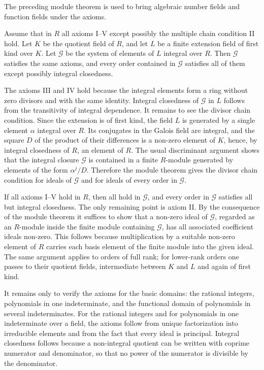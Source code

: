\documentclass[11pt]{article}
\begin{document}
The preceding module theorem is used to bring algebraic number fields and function fields under the axioms.

Assume that in $R$ all axioms I--V except possibly the multiple chain condition II hold. Let $K$ be the quotient field of $R$, and let $L$ be a finite extension field of first kind over $K$. Let $\mathcal G$ be the system of elements of $L$ integral over $R$. Then $\mathcal G$ satisfies the same axioms, and every order contained in $\mathcal G$ satisfies all of them except possibly integral closedness.

The axioms III and IV hold because the integral elements form a ring without zero divisors and with the same identity. Integral closedness of $\mathcal G$ in $L$ follows from the transitivity of integral dependence. It remains to see the divisor chain condition. Since the extension is of first kind, the field $L$ is generated by a single element $\alpha$ integral over $R$. Its conjugates in the Galois field are integral, and the square $D$ of the product of their differences is a non-zero element of $K$, hence, by integral closedness of $R$, an element of $R$. The usual discriminant argument shows that the integral closure $\mathcal G$ is contained in a finite $R$-module generated by elements of the form $\alpha^j/D$. Therefore the module theorem gives the divisor chain condition for ideals of $\mathcal G$ and for ideals of every order in $\mathcal G$.

If all axioms I--V hold in $R$, then all hold in $\mathcal G$, and every order in $\mathcal G$ satisfies all but integral closedness. The only remaining point is axiom II. By the consequence of the module theorem it suffices to show that a non-zero ideal of $\mathcal G$, regarded as an $R$-module inside the finite module containing $\mathcal G$, has all associated coefficient ideals non-zero. This follows because multiplication by a suitable non-zero element of $R$ carries each basis element of the finite module into the given ideal. The same argument applies to orders of full rank; for lower-rank orders one passes to their quotient fields, intermediate between $K$ and $L$ and again of first kind.

It remains only to verify the axioms for the basic domains: the rational integers, polynomials in one indeterminate, and the functional domain of polynomials in several indeterminates. For the rational integers and for polynomials in one indeterminate over a field, the axioms follow from unique factorization into irreducible elements and from the fact that every ideal is principal. Integral closedness follows because a non-integral quotient can be written with coprime numerator and denominator, so that no power of the numerator is divisible by the denominator.
\end{document}
